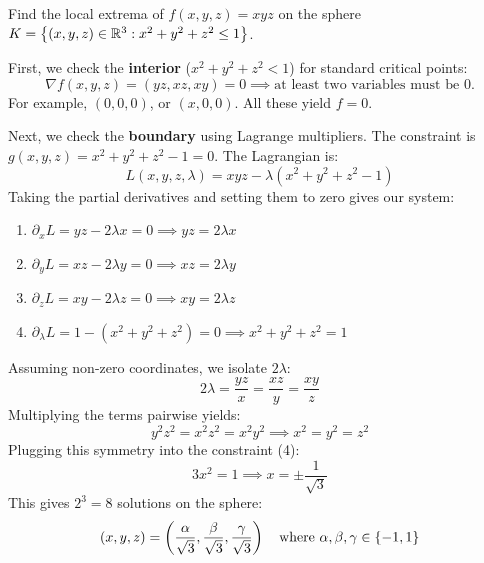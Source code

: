 \begin{exercise*}
Find the local extrema of $f(x,y,z) = xyz$ on the sphere $K = \left\{ (x,y,z) \in \mathbb{R}^3 : x^2 + y^2 + z^2 \le 1 \right\}$.
\end{exercise*}

\begin{solution}
First, we check the \textbf{interior} ($x^2 + y^2 + z^2 < 1$) for standard critical points:
\[ \nabla f(x,y,z) = (yz, xz, xy) = 0 \implies \text{at least two variables must be } 0. \]
For example, $(0,0,0)$, or $(x,0,0)$. All these yield $f = 0$.

Next, we check the \textbf{boundary} using Lagrange multipliers. The constraint is $g(x,y,z) = x^2 + y^2 + z^2 - 1 = 0$. The Lagrangian is:
\[ L(x,y,z,\lambda) = xyz - \lambda(x^2 + y^2 + z^2 - 1) \]
Taking the partial derivatives and setting them to zero gives our system:
\begin{enumerate}
    \item $\partial_x L = yz - 2\lambda x = 0 \implies yz = 2\lambda x$
    \item $\partial_y L = xz - 2\lambda y = 0 \implies xz = 2\lambda y$
    \item $\partial_z L = xy - 2\lambda z = 0 \implies xy = 2\lambda z$
    \item $\partial_\lambda L = 1 - (x^2 + y^2 + z^2) = 0 \implies x^2 + y^2 + z^2 = 1$
\end{enumerate}


Assuming non-zero coordinates, we isolate $2\lambda$:
\[ 2\lambda = \frac{yz}{x} = \frac{xz}{y} = \frac{xy}{z} \]
Multiplying the terms pairwise yields:
\[ y^2 z^2 = x^2 z^2 = x^2 y^2 \implies x^2 = y^2 = z^2 \]
Plugging this symmetry into the constraint (4):
\[ 3x^2 = 1 \implies x = \pm \frac{1}{\sqrt{3}} \]
This gives $2^3 = 8$ solutions on the sphere:
\[ (x,y,z) = \left( \frac{\alpha}{\sqrt{3}}, \frac{\beta}{\sqrt{3}}, \frac{\gamma}{\sqrt{3}} \right) \quad \text{where } \alpha, \beta, \gamma \in \left\{ -1, 1 \right\} \]
\end{solution}

\hrulefill

